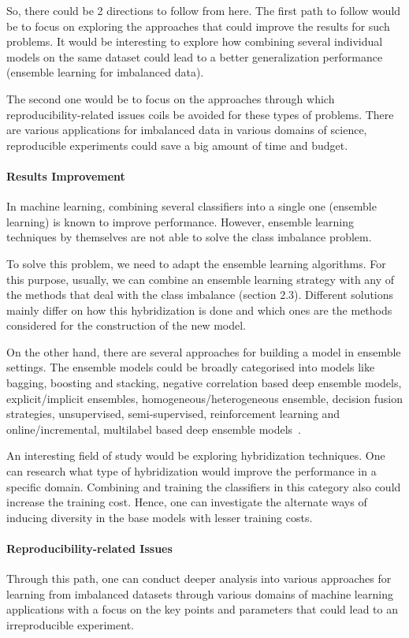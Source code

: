 So, there could be 2 directions to follow from here. The first path to follow would be to 
focus on exploring the approaches that could improve the results for such problems. 
It would be interesting to explore how combining several individual models on the same 
dataset could lead to a better generalization performance (ensemble learning for imbalanced data).

The second one would be to focus on the approaches through which reproducibility-related 
issues coils be avoided for these types of problems. There are various applications for 
imbalanced data in various domains of science, reproducible experiments could save a big 
amount of time and budget. 

\paragraph{Results Improvement}
In machine learning, combining several classifiers into a single one (ensemble learning) 
is known to improve performance. However, ensemble learning techniques by themselves are 
not able to solve the class imbalance problem. 

To solve this problem, we need to adapt the ensemble learning algorithms. For this purpose, 
usually, we can combine an ensemble learning strategy with any of the methods that deal 
with the class imbalance (section 2.3). Different solutions mainly differ on how this 
hybridization is done and which ones are the methods considered for the construction of 
the new model.

On the other hand, there are several approaches for building a model in ensemble settings. 
The ensemble models could be broadly categorised into models like bagging, boosting and 
stacking, negative correlation based deep ensemble models, explicit/implicit ensembles, 
homogeneous/heterogeneous ensemble, decision fusion strategies, unsupervised, semi-supervised, 
reinforcement learning and online/incremental, multilabel based deep 
ensemble models~\cite{ganaie2021ensemble}.

An interesting field of study would be exploring hybridization techniques. One can research 
what type of hybridization would improve the performance in a specific domain. 
Combining and training the classifiers in this category also could increase the 
training cost. Hence, one can investigate the alternate ways of inducing diversity 
in the base models with lesser training costs.

\paragraph{Reproducibility-related Issues}
Through this path, one can conduct deeper analysis into various approaches for learning 
from imbalanced datasets through various domains of machine learning applications with a 
focus on the key points and parameters that could lead to an irreproducible experiment.

